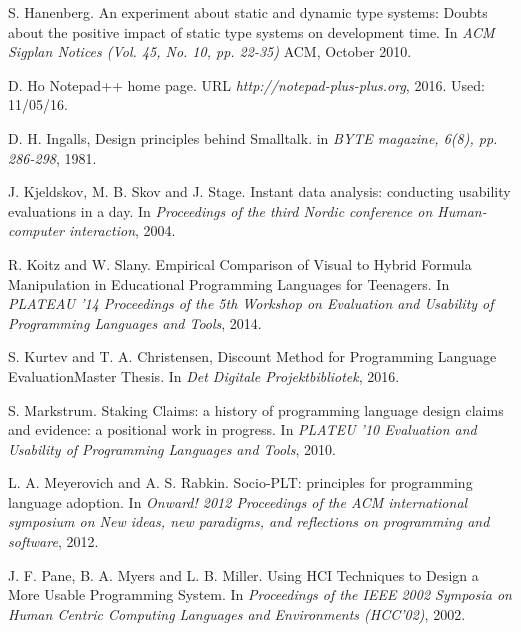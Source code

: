 \documentclass[preprint,10pt]{sigplanconf}
\begin{document}
\begin{thebibliography}{}
S. Hanenberg. \newblock An experiment about static and dynamic type systems: Doubts about the positive impact of static type systems on development time. \newblock In \emph{ACM Sigplan Notices (Vol. 45, No. 10, pp. 22-35)} ACM, October 2010.

D. Ho \newblock Notepad++ home page. \newblock URL \emph{http://notepad-plus-plus.org}, 2016. \newblock Used: 11/05/16.

D. H. Ingalls,  \newblock Design principles behind Smalltalk. \newblock in \emph{BYTE magazine, 6(8), pp. 286-298}, 1981. 

J. Kjeldskov, M. B. Skov and J. Stage. \newblock Instant data analysis: conducting usability evaluations in a day. \newblock In \emph{Proceedings of the third Nordic conference on Human-computer interaction}, 2004.

R. Koitz and W. Slany. \newblock Empirical Comparison of Visual to Hybrid Formula Manipulation in Educational Programming Languages for Teenagers. \newblock In \emph{PLATEAU '14 Proceedings of the 5th Workshop on Evaluation and Usability of Programming Languages and Tools}, 2014.

S. Kurtev and T. A. Christensen, \newblock Discount Method for Programming Language Evaluation\newblock Master Thesis. In \emph{Det Digitale Projektbibliotek}, 2016.

S. Markstrum. \newblock Staking Claims: a history of programming language design claims and evidence: a positional work in progress. \newblock In \emph{PLATEU '10 Evaluation and Usability of Programming Languages and Tools}, 2010.

L. A. Meyerovich and A. S. Rabkin. \newblock Socio-PLT: principles for programming language adoption. \newblock In \emph{Onward! 2012 Proceedings of the ACM international symposium on New ideas, new paradigms, and reflections on programming and software}, 2012.

J. F. Pane, B. A. Myers and L. B. Miller. \newblock Using HCI Techniques to Design a More Usable Programming System. \newblock In \emph{Proceedings of the IEEE 2002 Symposia on Human Centric Computing Languages and Environments (HCC’02)}, 2002.


\end{thebibliography}
\end{document}
